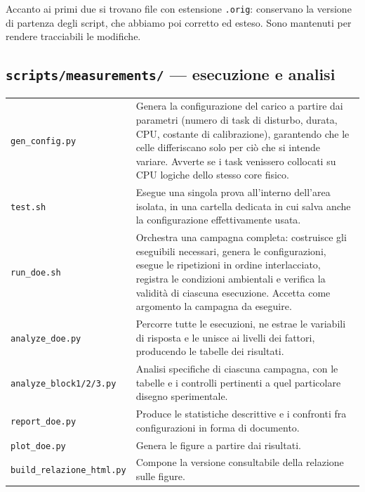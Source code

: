 \documentclass[11pt,a4paper]{article}
\begin{document}
Accanto ai primi due si trovano file con estensione \texttt{.orig}: conservano la versione di
partenza degli script, che abbiamo poi corretto ed esteso. Sono mantenuti per rendere tracciabili
le modifiche.

\subsection*{\texttt{scripts/measurements/} --- esecuzione e analisi}

\begin{center}\small
\begin{tabular}{p{4.3cm}p{10.0cm}}
\toprule
\texttt{gen\_config.py} & Genera la configurazione del carico a partire dai parametri (numero di
task di disturbo, durata, CPU, costante di calibrazione), garantendo che le celle differiscano solo
per ci\`o che si intende variare. Avverte se i task venissero collocati su CPU logiche dello stesso
core fisico. \\
\addlinespace
\texttt{test.sh} & Esegue una singola prova all'interno dell'area isolata, in una cartella dedicata
in cui salva anche la configurazione effettivamente usata. \\
\addlinespace
\texttt{run\_doe.sh} & Orchestra una campagna completa: costruisce gli eseguibili necessari, genera
le configurazioni, esegue le ripetizioni in ordine interlacciato, registra le condizioni ambientali
e verifica la validit\`a di ciascuna esecuzione. Accetta come argomento la campagna da eseguire. \\
\addlinespace
\texttt{analyze\_doe.py} & Percorre tutte le esecuzioni, ne estrae le variabili di risposta e le
unisce ai livelli dei fattori, producendo le tabelle dei risultati. \\
\addlinespace
\texttt{analyze\_block1/2/3.py} & Analisi specifiche di ciascuna campagna, con le tabelle e i
controlli pertinenti a quel particolare disegno sperimentale. \\
\addlinespace
\texttt{report\_doe.py} & Produce le statistiche descrittive e i confronti fra configurazioni in
forma di documento. \\
\addlinespace
\texttt{plot\_doe.py} & Genera le figure a partire dai risultati. \\
\addlinespace
\texttt{build\_relazione\_html.py} & Compone la versione consultabile della relazione sulle figure. \\
\bottomrule
\end{tabular}
\end{center}
\end{document}

